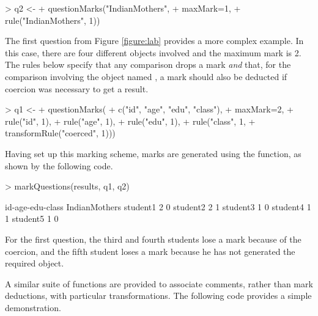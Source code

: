 \begin{Schunk}
\begin{Sinput}
> q2 <- 
+     questionMarks("IndianMothers",
+                   maxMark=1,
+                   rule("IndianMothers", 1))
\end{Sinput}
\end{Schunk}
The first question from Figure \ref{figure:lab} provides a more
complex example.  In this case, there are four different objects
involved and the maximum mark is 2.  The rules below specify that
any  comparison drops a mark \emph{and} that, for
the comparison involving the object named , 
a mark should also be deducted 
if coercion was necessary to get
a  result. 

\begin{Schunk}
\begin{Sinput}
> q1 <- 
+     questionMarks(
+         c("id", "age", "edu", "class"),
+         maxMark=2,
+         rule("id", 1),
+         rule("age", 1),
+         rule("edu", 1),
+         rule("class", 1,
+              transformRule("coerced", 1)))
\end{Sinput}
\end{Schunk}
Having set up this marking scheme, marks are generated using 
the  function, as shown by the following code.

\begin{Schunk}
\begin{Sinput}
> markQuestions(results, q1, q2)
\end{Sinput}
\begin{Soutput}
         id-age-edu-class IndianMothers
student1                2             0
student2                2             1
student3                1             0
student4                1             1
student5                1             0
\end{Soutput}
\end{Schunk}
For the first question, the third and fourth students lose a mark because
of the coercion, and 
the fifth student loses a mark because he has not generated 
the required object.

A similar suite of functions are provided to associate comments,
rather than mark deductions, with  
particular transformations.  The following code provides
 a simple demonstration.

